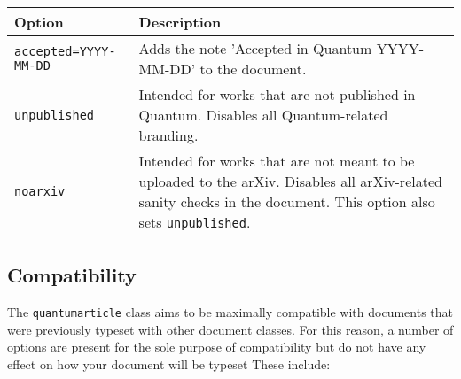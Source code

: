 \documentclass[a4paper,noarxiv,onecolumn]{quantumarticle}
\newenvironment{options}
	{\medskip\noindent\begin{longtable}{p{.25\columnwidth}p{.694\columnwidth}}
	\textsf{Option} & \textsf{Description} \\
	\midrule
	}
	{\bottomrule\end{longtable}}
\newcommand{\option}[2]{
	\small\texttt{#1} & {\small#2} \\
}
\begin{document}
	\begin{options}
		\option{accepted=YYYY-MM-DD}{%
			Adds the note 'Accepted in Quantum YYYY-MM-DD' to the document.
		}
		\option{unpublished}{%
			Intended for works that are not published in Quantum. Disables all Quantum-related branding.
		}
		\option{noarxiv}{%
			Intended for works that are not meant to be uploaded to the arXiv. Disables all arXiv-related sanity checks in the document. This option also sets \texttt{unpublished}.
		}
	\end{options}

	\subsection{Compatibility}
	The \texttt{quantumarticle} class aims to be maximally compatible with documents that were previously typeset with other document classes. For this reason, a number of options are present for the sole purpose of compatibility but do not have any effect on how your document will be typeset These include:
	
\end{document}
